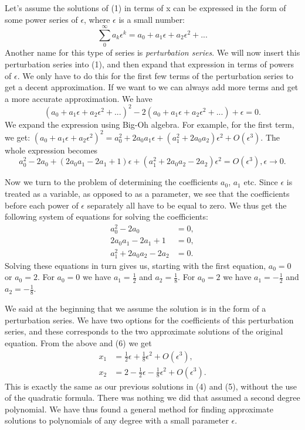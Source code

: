 \documentclass[12pt]{article}
\begin{document}
Let's assume the solutions of (1) in terms of x can be expressed in
the form of some power series of $\epsilon$, where $\epsilon$ is a
small number:
\begin{equation}
\sum_0^{\infty} a_k \epsilon^k = a_0 + a_1 \epsilon + a_2 \epsilon^2 + ...
\end{equation}
Another name for this type of series is \textit{perturbation series}.
We will now insert this perturbation series into (1), and then expand that
expression in terms of powers of $\epsilon$. We only have to do this
for the first few terms of the perturbation series to get a decent
approximation. If we want to we can always add more terms and get a
more accurate approximation. We have
\begin{equation}
(a_0 + a_1 \epsilon + a_2 \epsilon^2 + ...)^2 - 2(a_0 + a_1 \epsilon + a_2
\epsilon^2 + ...) + \epsilon = 0.
\end{equation}
We expand the expression using Big-Oh algebra. For example, for the
first term, we get: $(a_0 + a_1 \epsilon + a_2 \epsilon^2)^2 = a_0^2 +
2 a_0 a_1 \epsilon + (a_1^2 + 2 a_0 a_2) \epsilon^2 + O(\epsilon^3)$.
The whole expression becomes
\begin{equation}
a_0^2 - 2 a_0 + (2 a_0 a_1 - 2 a_1 + 1)\epsilon + (a_1^2 + 2 a_0 a_2 - 2 a_2)
\epsilon^2 = O(\epsilon^3), \epsilon \to 0.
\end{equation}

Now we turn to the problem of determining the coefficients $a_0$,
$a_1$ etc. Since $\epsilon$ is treated as a variable, as opposed to as
a parameter, we see that the coefficients before each power of
$\epsilon$ separately all have to be equal to zero. We thus get the
following system of equations for solving the coefficients:
\begin{align}
a_0^2 - 2 a_0 &=0, \\
2 a_0 a_1 - 2 a_1 + 1 &= 0, \\
a_1^2 + 2 a_0 a_2 - 2 a_2 &= 0.
\end{align}
Solving these equations in turn gives us, starting with the first
equation, $a_0 = 0$ or $a_0 = 2$. For $a_0 = 0$ we have $a_1 =
\frac{1}{2}$ and $a_2 = \frac{1}{8}$. For $a_0 = 2$ we have $a_1 = -
\frac{1}{2}$ and $a_2 = - \frac{1}{8}$.

We said at the beginning that we assume the solution is in the form of
a perturbation series. We have two options for the coefficients of
this perturbation series, and these corresponds to the two approximate
solutions of the original equation. From the above and (6) we get
\begin{align}
x_1 &= \frac{1}{2} \epsilon + \frac{1}{8} \epsilon^2 + O(\epsilon^3), \\
x_2 &= 2 - \frac{1}{2} \epsilon - \frac{1}{8} \epsilon^2 + O(\epsilon^3).
\end{align}
This is exactly the same as our previous solutions in (4) and (5),
without the use of the quadratic formula. There was nothing we did
that assumed a second degree polynomial. We have thus found a general
method for finding approximate solutions to polynomials of any degree
with a small parameter $\epsilon$.
\end{document}
